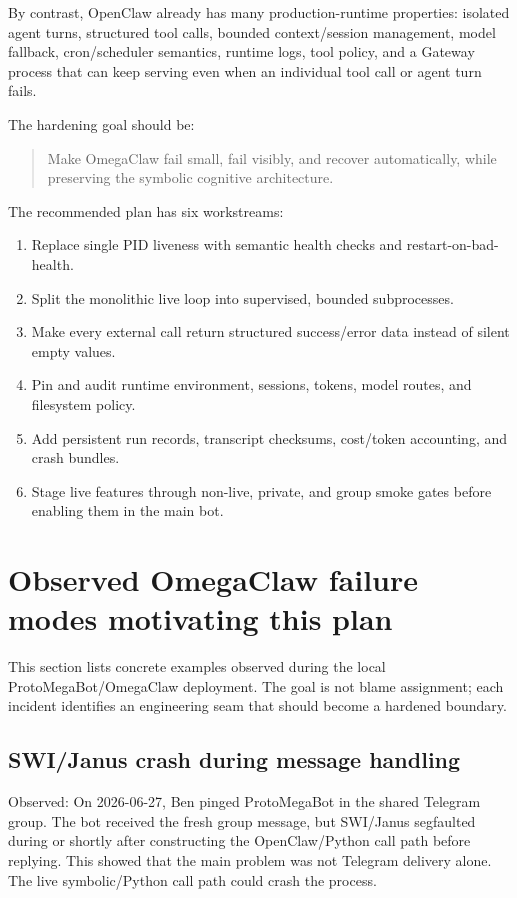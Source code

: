 \documentclass[11pt]{article}
\begin{document}
By contrast, OpenClaw already has many production-runtime properties: isolated agent turns, structured tool calls, bounded context/session management, model fallback, cron/scheduler semantics, runtime logs, tool policy, and a Gateway process that can keep serving even when an individual tool call or agent turn fails.

The hardening goal should be:

\begin{quote}
Make OmegaClaw fail small, fail visibly, and recover automatically, while preserving the symbolic cognitive architecture.
\end{quote}

The recommended plan has six workstreams:

\begin{enumerate}
  \item Replace single PID liveness with semantic health checks and restart-on-bad-health.
  \item Split the monolithic live loop into supervised, bounded subprocesses.
  \item Make every external call return structured success/error data instead of silent empty values.
  \item Pin and audit runtime environment, sessions, tokens, model routes, and filesystem policy.
  \item Add persistent run records, transcript checksums, cost/token accounting, and crash bundles.
  \item Stage live features through non-live, private, and group smoke gates before enabling them in the main bot.
\end{enumerate}

\section{Observed OmegaClaw failure modes motivating this plan}

This section lists concrete examples observed during the local ProtoMegaBot/OmegaClaw deployment. The goal is not blame assignment; each incident identifies an engineering seam that should become a hardened boundary.

\subsection{SWI/Janus crash during message handling}

Observed: On 2026-06-27, Ben pinged ProtoMegaBot in the shared Telegram group. The bot received the fresh group message, but SWI/Janus segfaulted during or shortly after constructing the OpenClaw/Python call path before replying. This showed that the main problem was not Telegram delivery alone. The live symbolic/Python call path could crash the process.
\end{document}

